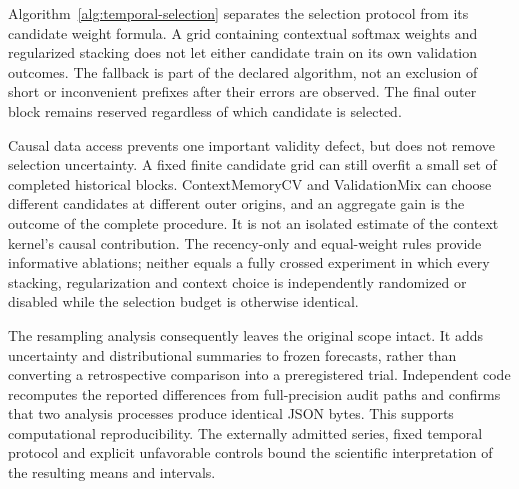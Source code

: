 Algorithm~\ref{alg:temporal-selection} separates the selection protocol from
its candidate weight formula. A grid containing contextual softmax weights and
regularized stacking does not let either candidate train on its own validation
outcomes. The fallback is part of the declared algorithm, not an exclusion of
short or inconvenient prefixes after their errors are observed. The final
outer block remains reserved regardless of which candidate is selected.

Causal data access prevents one important validity defect, but does not remove
selection uncertainty. A fixed finite candidate grid can still overfit a small
set of completed historical blocks. ContextMemoryCV and ValidationMix can
choose different candidates at different outer origins, and an aggregate
gain is the outcome of the complete procedure. It is not an isolated estimate
of the context kernel's causal contribution. The recency-only and equal-weight
rules provide informative ablations; neither equals a fully crossed experiment
in which every stacking, regularization and context choice is independently
randomized or disabled while the selection budget is otherwise identical.

The resampling analysis consequently leaves the original scope intact. It
adds uncertainty and distributional summaries to frozen forecasts, rather
than converting a retrospective comparison into a preregistered trial.
Independent code recomputes the reported differences from full-precision
audit paths and confirms that two analysis processes produce identical JSON
bytes. This supports computational reproducibility. The externally admitted
series, fixed temporal protocol and explicit unfavorable controls bound the
scientific interpretation of the resulting means and intervals.
